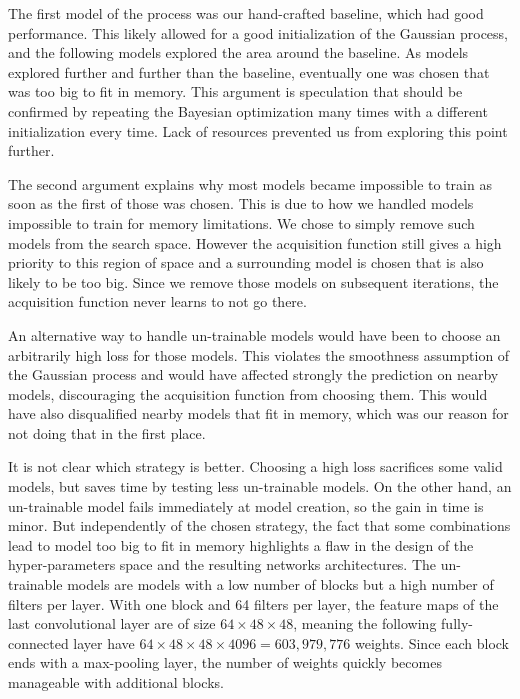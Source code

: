 The first model of the process was our hand-crafted baseline, which had good performance. This likely allowed for a good initialization of the Gaussian process, and the following models explored the area around the baseline. As models explored further and further than the baseline, eventually one was chosen that was too big to fit in memory. This argument is speculation that should be confirmed by repeating the Bayesian optimization many times with a different initialization every time. Lack of resources prevented us from exploring this point further.

The second argument explains why most models became impossible to train as soon as the first of those was chosen. This is due to how we handled models impossible to train for memory limitations. We chose to simply remove such models from the search space. However the acquisition function still gives a high priority to this region of space and a surrounding model is chosen that is also likely to be too big. Since we remove those models on subsequent iterations, the acquisition function never learns to not go there.

An alternative way to handle un-trainable models would have been to choose an arbitrarily high loss for those models. This violates the smoothness assumption of the Gaussian process and would have affected strongly the prediction on nearby models, discouraging the acquisition function from choosing them. This would have also disqualified nearby models that fit in memory, which was our reason for not doing that in the first place. 

It is not clear which strategy is better. Choosing a high loss sacrifices some valid models, but saves time by testing less un-trainable models. On the other hand, an un-trainable model fails immediately at model creation, so the gain in time is minor. 
But independently of the chosen strategy, the fact that some combinations lead to model too big to fit in memory highlights a flaw in the design of the hyper-parameters space and the resulting networks architectures. The un-trainable models are models with a low number of blocks but a high number of filters per layer. With one block and 64 filters per layer, the feature maps of the last convolutional layer are of size $64 \times 48 \times 48$, meaning the following fully-connected layer have $64 \times 48 \times 48 \times 4096 = 603,979,776$ weights. Since each block ends with a max-pooling layer, the number of weights quickly becomes manageable with additional blocks. 


